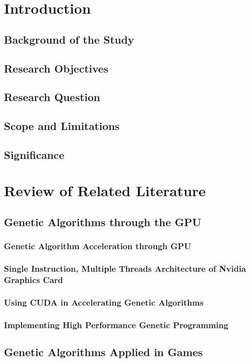 \documentclass{acm_proc_article-sp}
\begin{document}
\section{Introduction}
\subsection{Background of the Study}
\subsection{Research Objectives}
\subsection{Research Question}
\subsection{Scope and Limitations}
\subsection{Significance}
\section{Review of Related Literature}
\subsection{Genetic Algorithms through the GPU}
\subsubsection{Genetic Algorithm Acceleration through GPU}
\subsubsection{Single Instruction, Multiple Threads Architecture of Nvidia
Graphics Card}
\subsubsection{Using CUDA in Accelerating Genetic Algorithms}
\subsubsection{Implementing High Performance Genetic Programming}
\subsection{Genetic Algorithms Applied in Games}
\end{document}
